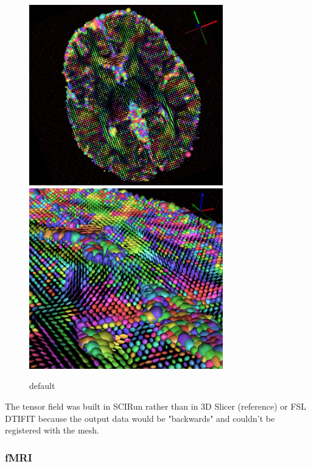 \begin{figure}[p]
\begin{center}
\includegraphics[width=0.75\textwidth]{Figures/DTI_1.png}
\includegraphics[width=0.75\textwidth]{Figures/DTI_2.png}
\caption{default}
\label{default}
\end{center}
\end{figure}

The tensor field was built in SCIRun rather than in 3D Slicer (reference) or FSL DTIFIT because the output data would be "backwards" and couldn't be registered with the mesh. 

\subsubsection{fMRI}
\label{sec:fmripre}

